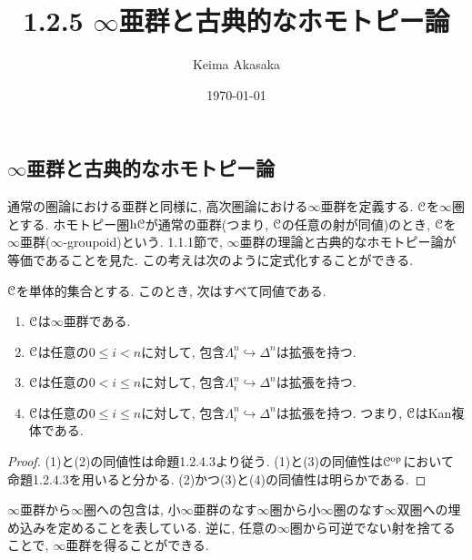 \documentclass[uplatex, a4paper, 14Q, dvipdfmx]{jsreport}
\title{1.2.5 \texorpdfstring{$\infty$}{infty}亜群と古典的なホモトピー論}
\author{Keima Akasaka}
\date{\today}
\begin{document}

\setcounter{chapter}{1}
\setcounter{section}{2} 
\setcounter{subsection}{4}   
\setcounter{subsubsection}{1}

\subsection{\texorpdfstring{$\infty$}{infty}亜群と古典的なホモトピー論}

通常の圏論における亜群と同様に, 高次圏論における$\infty$亜群を定義する. 
$\mathcal{C}$を$\infty$圏とする. 
ホモトピー圏$\mathrm{h}\mathcal{C}$が通常の亜群(つまり, $\mathcal{C}$の任意の射が同値)のとき, $\mathcal{C}$を$\infty$亜群($\infty$-groupoid)という. 
1.1.1節で, $\infty$亜群の理論と古典的なホモトピー論が等価であることを見た. 
この考えは次のように定式化することができる.

\begin{proposition} \label{prop.1.2.5.1}
  $\mathcal{C}$を単体的集合とする. 
  このとき, 次はすべて同値である. 
  \begin{enumerate}
    \item $\mathcal{C}$は$\infty$亜群である. 
    \item $\mathcal{C}$は任意の$0 \leq i < n$に対して, 包含$\Lambda^n_i \hookrightarrow \Delta^n$は拡張を持つ.
    \item $\mathcal{C}$は任意の$0 < i \leq n$に対して, 包含$\Lambda^n_i \hookrightarrow \Delta^n$は拡張を持つ.
    \item $\mathcal{C}$は任意の$0 \leq i \leq n$に対して, 包含$\Lambda^n_i \hookrightarrow \Delta^n$は拡張を持つ.
    つまり, $\mathcal{C}$はKan複体である. 
  \end{enumerate}
\end{proposition}

\begin{proof}
  (1)と(2)の同値性は命題1.2.4.3より従う. 
  (1)と(3)の同値性は$\mathcal{C}^{\mathrm{op}}$において命題1.2.4.3を用いると分かる. 
  (2)かつ(3)と(4)の同値性は明らかである. 
\end{proof}

\begin{remark} \label{rem.1.2.5.2}
  
\end{remark}

$\infty$亜群から$\infty$圏への包含は, 小$\infty$亜群のなす$\infty$圏から小$\infty$圏のなす$\infty$双圏への埋め込みを定めることを表している. 
逆に, 任意の$\infty$圏から可逆でない射を捨てることで, $\infty$亜群を得ることができる. 
\end{document}
